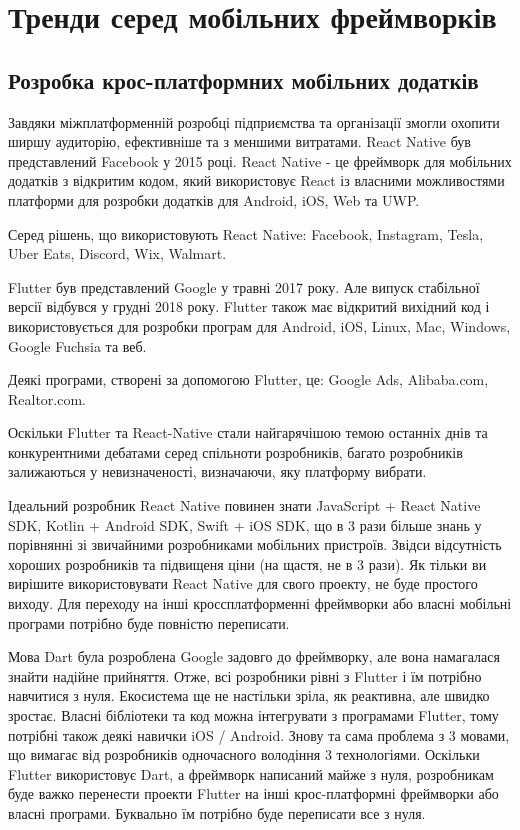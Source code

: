 \renewcommand{\proofname}{Доведення}
\renewcommand{\chaptername}{РОЗДІЛ}


\chapter{Тренди серед мобільних фреймворків}
\label{ch1}


\section{Розробка крос-платформних мобільних додатків}
\label{sec:cross_platform_dev}
Завдяки міжплатформенній розробці підприємства та організації змогли охопити ширшу аудиторію, ефективніше та з меншими витратами.
React Native був представлений Facebook у 2015 році.
React Native - це фреймворк для мобільних додатків з відкритим кодом, який використовує React із власними можливостями платформи для розробки додатків для Android, iOS, Web та UWP.

Серед рішень, що використовують React Native: Facebook, Instagram, Tesla, Uber Eats, Discord, Wix, Walmart.

Flutter був представлений Google у травні 2017 року. Але випуск стабільної версії відбувся у грудні 2018 року.
Flutter також має відкритий вихідний код і використовується для розробки програм для Android, iOS, Linux, Mac, Windows, Google Fuchsia та веб.

Деякі програми, створені за допомогою Flutter, це: Google Ads, Alibaba.com, Realtor.com.

Оскільки Flutter та React-Native стали найгарячішою темою останніх днів та конкурентними дебатами серед спільноти розробників, багато розробників залижаються у невизначеності, визначаючи, яку платформу вибрати.

Ідеальний розробник React Native повинен знати JavaScript + React Native SDK, Kotlin + Android SDK, Swift + iOS SDK, що в 3 рази більше знань у порівнянні зі звичайними розробниками мобільних пристроїв.
Звідси відсутність хороших розробників та підвищеня ціни (на щастя, не в 3 рази).
Як тільки ви вирішите використовувати React Native для свого проекту, не буде простого виходу.
Для переходу на інші кроссплатформенні фреймворки або власні мобільні програми потрібно буде повністю переписати.

Мова Dart була розроблена Google задовго до фреймворку, але вона намагалася знайти надійне прийняття.
Отже, всі розробники рівні з Flutter і їм потрібно навчитися з нуля.
Екосистема ще не настільки зріла, як реактивна, але швидко зростає.
Власні бібліотеки та код можна інтегрувати з програмами Flutter, тому потрібні також деякі навички iOS / Android.
Знову та сама проблема з 3 мовами, що вимагає від розробників одночасного володіння 3 технологіями.
Оскільки Flutter використовує Dart, а фреймворк написаний майже з нуля, розробникам буде важко перенести проекти Flutter на інші крос-платформні фреймворки або власні програми.
Буквально їм потрібно буде переписати все з нуля.

